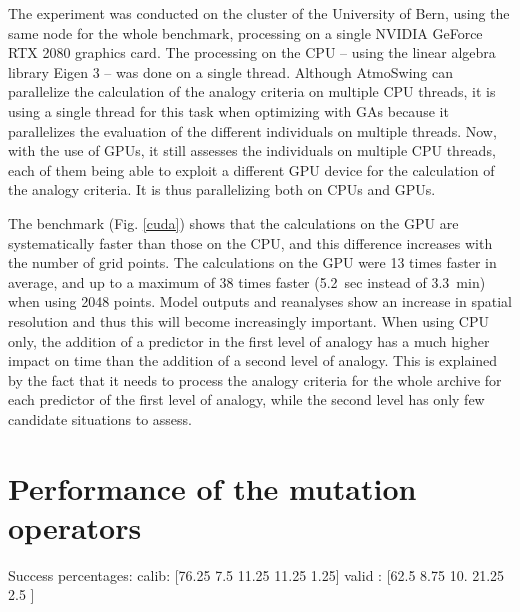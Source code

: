 \documentclass[draft]{agujournal2019}
\begin{document}
The experiment was conducted on the cluster of the University of Bern, using the same node for the whole benchmark, processing on a single NVIDIA GeForce RTX 2080 graphics card. The processing on the CPU -- using the linear algebra library Eigen 3 \cite{Guennebaud2010} -- was done on a single thread. Although AtmoSwing can parallelize the calculation of the analogy criteria on multiple CPU threads, it is using a single thread for this task when optimizing with GAs because it parallelizes the evaluation of the different individuals on multiple threads. Now, with the use of GPUs, it still assesses the individuals on multiple CPU threads, each of them being able to exploit a different GPU device for the calculation of the analogy criteria. It is thus parallelizing both on CPUs and GPUs.

The benchmark (Fig. \ref{cuda}) shows that the calculations on the GPU are systematically faster than those on the CPU, and this difference increases with the number of grid points. The calculations on the GPU were 13 times faster in average, and up to a maximum of 38 times faster (5.2~sec instead of 3.3~min) when using 2048 points. Model outputs and reanalyses show an increase in spatial resolution and thus this will become increasingly important. When using CPU only, the addition of a predictor in the first level of analogy has a much higher impact on time than the addition of a second level of analogy. This is explained by the fact that it needs to process the analogy criteria for the whole archive for each predictor of the first level of analogy, while the second level has only few candidate situations to assess.



\section{Performance of the mutation operators}


Success percentages:
calib: [76.25  7.5  11.25 11.25  1.25]
valid : [62.5   8.75 10.   21.25  2.5 ]
\end{document}
